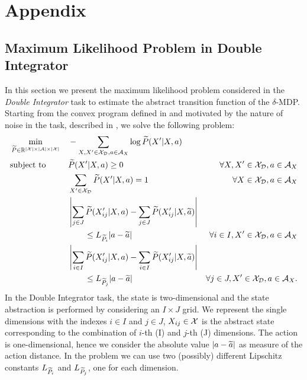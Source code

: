 \chapter{Appendix}

\section{Maximum Likelihood Problem in Double Integrator} \label{app:maxlike}
In this section we present the maximum likelihood problem considered in the \emph{Double Integrator} task to estimate the abstract transition function of the $\delta$-\ac{MDP}. Starting from the convex program defined in  and motivated by the nature of noise in the task, described in , we solve the following problem:
\begin{align}
&\min_{\widetilde{P}\in\mathbb{R}^{|\mathcal{X}|\times|\mathcal{A}|\times|\mathcal{X}|}} &&-\sum_{X,X'\in\mathcal{X}_{\mathcal{D}}, a\in\mathcal{A}_{X}}\log\widetilde{P}(X'|X,a) \nonumber\\
&\text{subject to} &&\widetilde{P}(X'|X,a) \geq 0 &\forall X,X'\in\mathcal{X}_{\mathcal{D}}, a\in\mathcal{A}_{X} \nonumber\\
& &&\sum_{X'\in\mathcal{X}_{\mathcal{D}}}\widetilde{P}(X'|X,a) = 1 &\forall X\in\mathcal{X}_{\mathcal{D}}, a\in\mathcal{A}_{X} \nonumber\\
& &&\left|\sum_{j \in J}\widetilde{P}(X'_{ij}|X,a) - \sum_{j \in J}\widetilde{P}(X'_{ij}|X,\widetilde{a})\right|& \nonumber \\
& && \qquad \leq L_{\widetilde{P}_{i}}|a- \widetilde{a}| &\forall i \in I,X'\in\mathcal{X}_{\mathcal{D}}, a\in\mathcal{A}_{X} \label{p:i}\\
& &&\left|\sum_{i \in I}\widetilde{P}(X'_{ij}|X,a) - \sum_{i \in I}\widetilde{P}(X'_{ij}|X,\widetilde{a})\right|& \nonumber \\
& && \qquad \leq L_{\widetilde{P}_{j}}|a- \widetilde{a}| &\forall j \in J,X'\in\mathcal{X}_{\mathcal{D}}, a\in\mathcal{A}_{X}. \label{p:j}
\end{align}
In the Double Integrator task, the state is two-dimensional and the state abstraction is performed by considering an $I \times J$ grid. We represent the single dimensions with the indexes $i \in I$ and $j \in J$, $X_{ij} \in \mathcal{X}$ is the abstract state corresponding to the combination of $i$-th (\wrt I) and $j$-th (\wrt J) dimensions. The action is one-dimensional, hence we consider the absolute value $|a-\widetilde{a}|$ as measure of the action distance. In the problem we can use two (possibly) different Lipschitz constants $L_{\widetilde{P}_{i}}$ and $L_{\widetilde{P}_{j}}$, one for each dimension.\\

